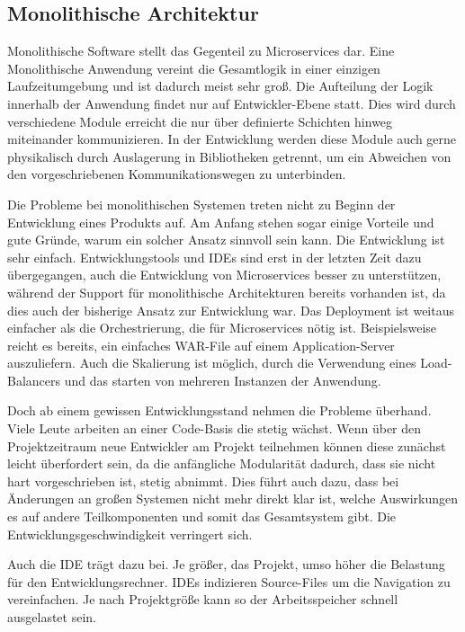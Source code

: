 \documentclass[12pt,a4paper,bibliography=totocnumbered,listof=totocnumbered]{scrartcl}
\begin{document}
\subsection{Monolithische Architektur}\label{ch:mon-arch}

Monolithische Software stellt das Gegenteil zu Microservices dar. Eine Monolithische Anwendung vereint die Gesamtlogik in einer einzigen Laufzeitumgebung und ist dadurch meist sehr groß. Die Aufteilung der Logik innerhalb der Anwendung findet nur auf Entwickler-Ebene statt. Dies wird durch verschiedene Module erreicht die nur über definierte Schichten hinweg miteinander kommunizieren. In der Entwicklung werden diese Module auch gerne physikalisch durch Auslagerung in Bibliotheken getrennt, um ein Abweichen von den vorgeschriebenen Kommunikationswegen zu unterbinden.

Die Probleme bei monolithischen Systemen treten nicht zu Beginn der Entwicklung eines Produkts auf. Am Anfang stehen sogar einige Vorteile und gute Gründe, warum ein solcher Ansatz sinnvoll sein kann.
Die Entwicklung ist sehr einfach. Entwicklungstools und IDEs sind erst in der letzten Zeit dazu übergegangen, auch die Entwicklung von Microservices besser zu unterstützen, während der Support für monolithische Architekturen bereits vorhanden ist, da dies auch der bisherige Ansatz zur Entwicklung war.
Das Deployment ist weitaus einfacher als die Orchestrierung, die für Microservices nötig ist. Beispielsweise reicht es bereits, ein einfaches WAR-File auf einem Application-Server auszuliefern.
Auch die Skalierung ist möglich, durch die Verwendung eines Load-Balancers und das starten von mehreren Instanzen der Anwendung.\cite{richardson}

Doch ab einem gewissen Entwicklungsstand nehmen die Probleme überhand. Viele Leute arbeiten an einer Code-Basis die stetig wächst. Wenn über den Projektzeitraum neue Entwickler am Projekt teilnehmen können diese zunächst leicht überfordert sein, da die anfängliche Modularität dadurch, dass sie nicht hart vorgeschrieben ist, stetig abnimmt. Dies führt auch dazu, dass bei Änderungen an großen Systemen nicht mehr direkt klar ist, welche Auswirkungen es auf andere Teilkomponenten und somit das Gesamtsystem gibt. Die Entwicklungsgeschwindigkeit verringert sich.

Auch die IDE trägt dazu bei. Je größer, das Projekt, umso höher die Belastung für den Entwicklungsrechner. IDEs indizieren Source-Files um die Navigation zu vereinfachen. Je nach Projektgröße kann so der Arbeitsspeicher schnell ausgelastet sein.
\end{document}
